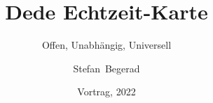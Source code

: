 


\usepackage{hyperref}

\usebackgroundtemplate

\usepackage{tikz}

\usepackage{listings}

\usepackage{colortbl}

\title[Dede]%
{Dede Echtzeit-Karte}

\subtitle{Offen, Unabhängig, Universell}

\author[Begerad]%
{Stefan~Begerad}

\date[2022]%
{Vortrag, 2022}

